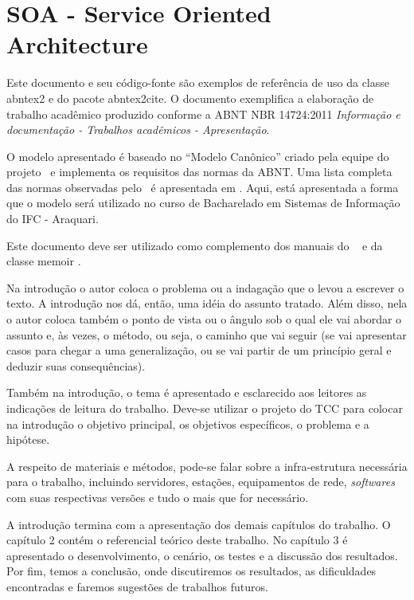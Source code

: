\section{SOA - Service Oriented Architecture}\label{sec:soa}

Este documento e seu código-fonte são exemplos de referência de uso da classe
\textsf{abntex2} e do pacote \textsf{abntex2cite}. O documento exemplifica a elaboração de trabalho acadêmico produzido conforme a ABNT NBR 14724:2011 \emph{Informação e documentação - Trabalhos acadêmicos - Apresentação}.

O modelo apresentado é baseado no ``Modelo Canônico'' criado pela equipe do projeto \abnTeX\, e implementa os requisitos das normas da ABNT. Uma lista completa das normas
observadas pelo \abnTeX\ é apresentada em . Aqui, está apresentada a forma que o modelo será utilizado no curso de Bacharelado em Sistemas de Informação do IFC - Araquari.

Este documento deve ser utilizado como complemento dos manuais do \abnTeX\ 
\cite{abntex2classe,abntex2cite,abntex2cite-alf} e da classe \textsf{memoir}
\cite{memoir}. 

Na introdução o autor coloca o problema ou a indagação que o levou a escrever o texto. A introdução nos dá, então, uma idéia do assunto tratado. Além disso, nela o autor coloca também o ponto de vista ou o ângulo sob o qual ele vai abordar o assunto e, às vezes, o método, ou seja, o caminho que vai seguir (se vai apresentar casos para chegar a uma generalização, ou se vai partir de um princípio geral e deduzir suas consequências).

Também na introdução, o tema é apresentado e esclarecido aos leitores as indicações de leitura do trabalho. Deve-se utilizar o projeto do TCC para colocar na introdução o objetivo principal, os objetivos específicos, o problema e a hipótese.

A respeito de materiais e métodos, pode-se falar sobre a infra-estrutura necessária para o trabalho, incluindo servidores, estações, equipamentos de rede, \emph{softwares} com suas respectivas versões e tudo o mais que for necessário.

A introdução termina com a apresentação dos demais capítulos do trabalho. O capítulo 2 contém o referencial teórico deste trabalho. No capítulo 3 é apresentado o desenvolvimento, o cenário, os testes e a discussão dos resultados. Por fim, temos a conclusão, onde discutiremos os resultados, as dificuldades encontradas e faremos sugestões de trabalhos futuros.